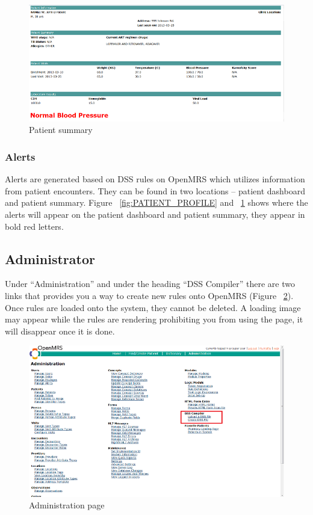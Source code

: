 \documentclass[12pt,letterpaper]{article}
\begin{document}
\begin{figure}\begin{center}
\includegraphics[width=6.5in]{user_guide/patient_summary.png}
\end{center}
\caption{Patient summary}
\label{fig:PATIENT_SUMMARY}
\end{figure}


\subsubsection{Alerts}
	Alerts are generated based on DSS rules on OpenMRS which utilizes information from patient encounters. They can be found in two locations – patient dashboard and patient summary. Figure ~\ref{fig:PATIENT_PROFILE} and ~\ref{fig:PATIENT_SUMMARY} shows where the alerts will appear on the patient dashboard and patient summary, they appear in bold red letters.

\subsection{Administrator}
	Under “Administration” and under the heading “DSS Compiler” there are two links that provides you a way to create new rules onto OpenMRS (Figure 
	~\ref{fig:ADMINISTRATION_PAGE}). Once rules are loaded onto the system, they cannot be deleted. A loading image may appear while the rules are rendering prohibiting you from using the page, it will disappear once it is done.

\begin{figure}\begin{center}
\includegraphics[width=6.5in]{user_guide/administration.png}
\end{center}
\caption{Administration page}
\label{fig:ADMINISTRATION_PAGE}
\end{figure}
\end{document}
